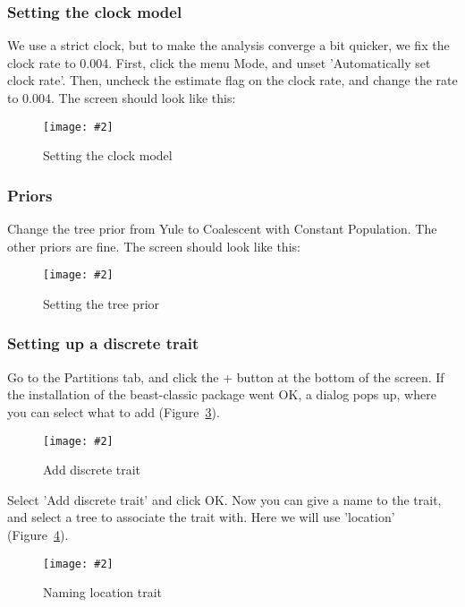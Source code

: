 \documentclass{article}
\newcommand{\includeimage}[2][]{%
\texttt{[image: \#2]}
}
\begin{document}
\subsubsection*{Setting the clock model}

We use a strict clock, but to make the analysis converge a bit quicker, we fix the clock rate to 0.004.
First, click the menu Mode, and unset 'Automatically set clock rate'. Then, uncheck the estimate flag on the clock rate, and change the rate to 0.004.
The screen should look like this:

\begin{figure}
\centering	
\includeimage[scale=0.3]{figures/BEAUti_clockmodel}
\caption{Setting the clock model}
\label{fig.BEAUti_clockmodel}
\end{figure}

\subsubsection*{Priors}

Change the tree prior from Yule to Coalescent with Constant Population. The other priors are fine. The screen should look like this:

\begin{figure}
\centering	
\includeimage[scale=0.3,clip=true,trim=0 400 0 0]{figures/BEAUti_priors}
\caption{Setting the tree prior}
\label{fig.BEAUti_priors}
\end{figure}

\subsubsection*{Setting up a discrete trait}

Go to the Partitions tab, and click the + button at the bottom of the screen.
If the installation of the beast-classic package went OK, a dialog pops up, where you can select what to add (Figure~\ref{fig.BEAUti_trait}).

\begin{figure}
\centering	
\includeimage[scale=0.3]{figures/BEAUti_trait}
\caption{Add discrete trait}
\label{fig.BEAUti_trait}
\end{figure}

Select 'Add discrete trait' and click OK. Now you can give a name to the trait, and select a tree to associate the trait with. Here we will use 'location' (Figure~\ref{fig.BEAUti_trait2}).

\begin{figure}
\centering	
\includeimage[scale=0.3]{figures/BEAUti_trait2}
\caption{Naming location trait}
\label{fig.BEAUti_trait2}
\end{figure}
\end{document}
